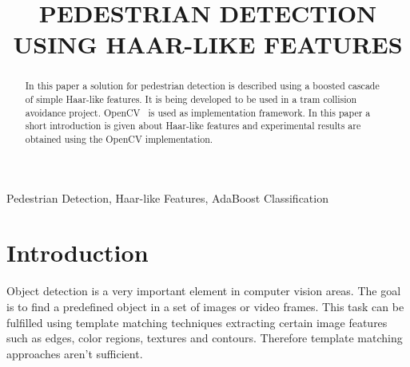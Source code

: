\documentclass{article}
\title{PEDESTRIAN DETECTION USING HAAR-LIKE FEATURES}
\begin{document}
%
\maketitle
%
\begin{abstract}
In this paper a solution for pedestrian detection is described using a boosted cascade of simple Haar-like features. It is being developed to be used in a tram collision avoidance project. OpenCV~\cite{opencv} is used as implementation framework. In this paper a short introduction is given about Haar-like features and experimental results are obtained using the OpenCV implementation.
\end{abstract}
%
\begin{keywords}
Pedestrian Detection, Haar-like Features, AdaBoost Classification
\end{keywords}
%
\section{Introduction}
\label{sec:intro}
Object detection is a very important element in computer vision areas. The goal is to find a predefined object in a set of images or video frames. This task can be fulfilled using template matching techniques extracting certain image features such as edges, color regions, textures and contours. Therefore template matching approaches aren't sufficient.
\par
\end{document}

